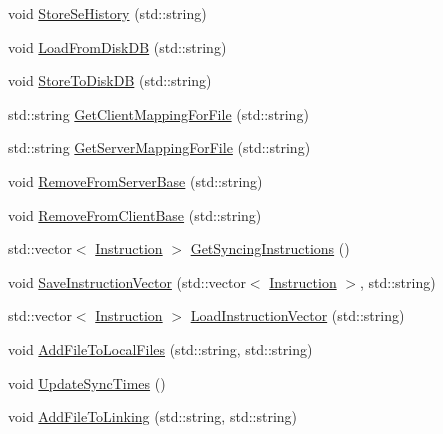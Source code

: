 \begin{DoxyCompactItemize}
void \hyperlink{classSyncManager_a544824270882f25ee9a51953ff6d01e1}{Store\-Se\-History} (std\-::string)
\item 
void \hyperlink{classSyncManager_abd86e09bcb63045f9bbb10995759d66e}{Load\-From\-Disk\-D\-B} (std\-::string)
\item 
void \hyperlink{classSyncManager_a9c89a90d5ce2ff872bae64078cda1a9c}{Store\-To\-Disk\-D\-B} (std\-::string)
\item 
std\-::string \hyperlink{classSyncManager_a7c9ca073cd89034b6acbeb80600c4018}{Get\-Client\-Mapping\-For\-File} (std\-::string)
\item 
std\-::string \hyperlink{classSyncManager_aba77517bf2a3aa264b7f767cc437f109}{Get\-Server\-Mapping\-For\-File} (std\-::string)
\item 
void \hyperlink{classSyncManager_af6f187df3ddd6dac240f0b5a911f01af}{Remove\-From\-Server\-Base} (std\-::string)
\item 
void \hyperlink{classSyncManager_a5e48909e45800376d51bc259eaca2048}{Remove\-From\-Client\-Base} (std\-::string)
\item 
std\-::vector$<$ \hyperlink{structInstruction}{Instruction} $>$ \hyperlink{classSyncManager_a739efca32fcef8216ac6cfcd4a1a223f}{Get\-Syncing\-Instructions} ()
\item 
void \hyperlink{classSyncManager_a3968c3ceac9dcd712cce6c8479d36487}{Save\-Instruction\-Vector} (std\-::vector$<$ \hyperlink{structInstruction}{Instruction} $>$, std\-::string)
\item 
std\-::vector$<$ \hyperlink{structInstruction}{Instruction} $>$ \hyperlink{classSyncManager_ad11b49727889ea3c5256a4329ac53aed}{Load\-Instruction\-Vector} (std\-::string)
\item 
void \hyperlink{classSyncManager_ae79f1eab5e60c63dd50099833a76def8}{Add\-File\-To\-Local\-Files} (std\-::string, std\-::string)
\item 
void \hyperlink{classSyncManager_a6364301da9ee476cd084863f6a9ff47c}{Update\-Sync\-Times} ()
\item 
void \hyperlink{classSyncManager_aac9a716e27bf4c9fff8e698f7adbf8b3}{Add\-File\-To\-Linking} (std\-::string, std\-::string)
\end{DoxyCompactItemize}
